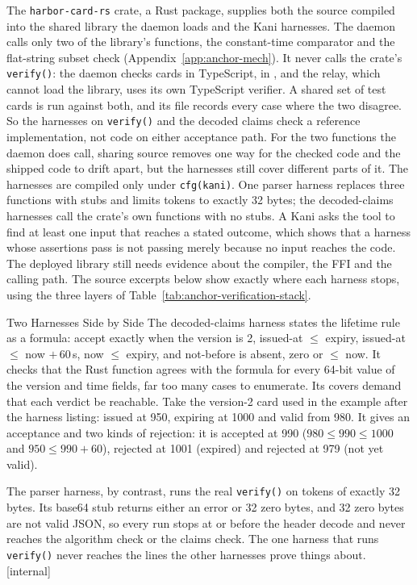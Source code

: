 \documentclass[11pt,a4paper]{article}
\theoremstyle{definition}
\begin{document}
The \texttt{harbor-card-rs} crate, a Rust package, supplies both the source
compiled into the shared library the daemon loads and the Kani harnesses. The
daemon calls only two of the library's functions, the constant-time comparator
and the flat-string subset check (Appendix~\ref{app:anchor-mech}). It never
calls the crate's \texttt{verify()}: the daemon checks cards in TypeScript, in
, and the relay, which cannot load the library,
uses its own TypeScript verifier. A shared set of test cards is run against
both, and its file records every case where the two disagree. So the harnesses
on \texttt{verify()} and the decoded claims check a reference implementation,
not code on either acceptance path. For the two functions the daemon does
call, sharing source removes one way for the checked code and the shipped code
to drift apart, but the harnesses still cover different parts of it. The harnesses are
compiled only under \texttt{cfg(kani)}. One parser harness replaces three
functions with stubs and limits tokens to exactly 32 bytes; the decoded-claims
harnesses call the crate's own functions with no stubs. A Kani
 asks the tool to find at least one input that reaches a stated
outcome, which shows that a harness whose assertions pass is not passing
merely because no input reaches the code. The deployed library still needs
evidence about the compiler, the FFI and the calling path. The source excerpts
below show exactly where each harness stops, using the three layers of
Table~\ref{tab:anchor-verification-stack}.

\begin{pdexample}{Two Harnesses Side by Side}
\setlength{\parskip}{4pt plus 1pt}
The decoded-claims harness states the lifetime rule as a formula: accept
exactly when the version is 2, issued-at $\le$ expiry, issued-at $\le$
now $+\,60$\,s, now $\le$ expiry, and not-before is absent, zero or $\le$ now.
It checks that the Rust function agrees with the formula for every 64-bit value
of the version and time fields, far too many cases to enumerate. Its covers
demand that each verdict be reachable. Take the version-2 card used in the
example after the harness listing: issued at 950, expiring at 1000 and valid
from 980. It gives an acceptance and two kinds of rejection:
it is accepted at 990 ($980 \le 990 \le 1000$ and $950 \le 990 + 60$),
rejected at 1001 (expired) and rejected at 979 (not yet valid).

The parser harness, by contrast, runs the real \texttt{verify()} on tokens of
exactly 32 bytes. Its base64 stub returns either an error or 32 zero bytes, and
32 zero bytes are not valid JSON, so every run stops at or before the header decode and
never reaches the algorithm check or the claims check. The one harness that
runs \texttt{verify()} never reaches the lines the other harnesses prove things
about. [internal]
\end{pdexample}
\end{document}
